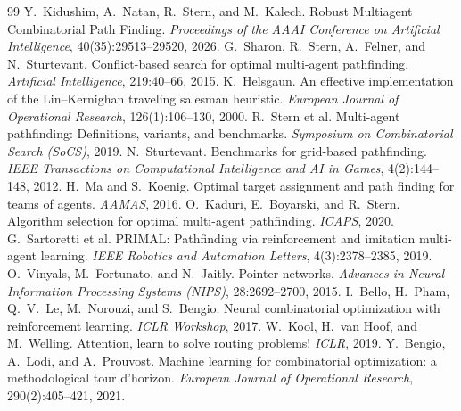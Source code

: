 \documentclass[11pt,a4paper]{article}
\begin{document}

{\footnotesize
\begin{thebibliography}{99}
\setlength{\itemsep}{0pt}
 Y.~Kidushim, A.~Natan, R.~Stern, and M.~Kalech. Robust Multiagent Combinatorial
  Path Finding. \emph{Proceedings of the AAAI Conference on Artificial Intelligence}, 40(35):29513--29520, 2026.
 G.~Sharon, R.~Stern, A.~Felner, and N.~Sturtevant. Conflict-based search for optimal
  multi-agent pathfinding. \emph{Artificial Intelligence}, 219:40--66, 2015.
 K.~Helsgaun. An effective implementation of the Lin--Kernighan traveling salesman
  heuristic. \emph{European Journal of Operational Research}, 126(1):106--130, 2000.
 R.~Stern et al. Multi-agent pathfinding: Definitions, variants, and benchmarks.
  \emph{Symposium on Combinatorial Search (SoCS)}, 2019.
 N.~Sturtevant. Benchmarks for grid-based pathfinding. \emph{IEEE Transactions
  on Computational Intelligence and AI in Games}, 4(2):144--148, 2012.
 H.~Ma and S.~Koenig. Optimal target assignment and path finding for teams of
  agents. \emph{AAMAS}, 2016.
 O.~Kaduri, E.~Boyarski, and R.~Stern. Algorithm selection for optimal multi-agent
  pathfinding. \emph{ICAPS}, 2020.
 G.~Sartoretti et al. PRIMAL: Pathfinding via reinforcement and imitation
  multi-agent learning. \emph{IEEE Robotics and Automation Letters}, 4(3):2378--2385, 2019.
 O.~Vinyals, M.~Fortunato, and N.~Jaitly. Pointer networks. \emph{Advances in
  Neural Information Processing Systems (NIPS)}, 28:2692--2700, 2015.
 I.~Bello, H.~Pham, Q.~V.~Le, M.~Norouzi, and S.~Bengio. Neural combinatorial
  optimization with reinforcement learning. \emph{ICLR Workshop}, 2017.
 W.~Kool, H.~van Hoof, and M.~Welling. Attention, learn to solve routing problems!
  \emph{ICLR}, 2019.
 Y.~Bengio, A.~Lodi, and A.~Prouvost. Machine learning for combinatorial
  optimization: a methodological tour d'horizon. \emph{European Journal of Operational Research},
  290(2):405--421, 2021.
\end{thebibliography}
}
\end{document}
